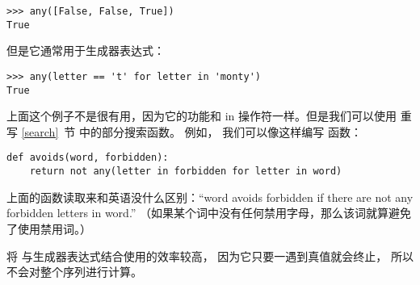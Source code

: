 
\begin{lstlisting}
>>> any([False, False, True])
True
\end{lstlisting}


但是它通常用于生成器表达式：


\begin{lstlisting}
>>> any(letter == 't' for letter in 'monty')
True
\end{lstlisting}


上面这个例子不是很有用，因为它的功能和 in 操作符一样。但是我们可以使用  重写 \ref{search}~节 中的部分搜索函数。  例如， 我们可以像这样编写  函数：


\begin{lstlisting}
def avoids(word, forbidden):
    return not any(letter in forbidden for letter in word)
\end{lstlisting}


上面的函数读取来和英语没什么区别：``word avoids forbidden if there
are not any forbidden letters in word.''
（如果某个词中没有任何禁用字母，那么该词就算避免了使用禁用词。）


将  与生成器表达式结合使用的效率较高， 因为它只要一遇到真值就会终止， 所以不会对整个序列进行计算。


